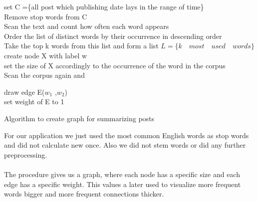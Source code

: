 \begin{algorithm}
	
	set C =\{all post which publishing date lays in the range of time\} \\
	Remove stop words from C \\
	Scan the text and count how often each word appears \\
	Order the list of distinct words by their occurrence in descending order \\
	Take the top k words from this list and form a list $  L = \{ k  \quad most \quad used  \quad words\}$ \\
	{
		create node X with label w \\
		set the size of X accordingly to the occurrence of the word in the corpus  \\
	}
	Scan the corpus again and \\
	{
		{	
			draw edge E($w_1$ ,$w_2$)\\
			set weight of E to 1 \\
			
		}
		
	}
	
	\caption{Algorithm to create graph for summarizing  posts}
\end{algorithm}

For our application we  just used the most common English words as stop words and did not calculate new once. Also we did not stem words or did any further preprocessing. \\
~\\

The procedure gives us a graph, where each node has a specific size and each edge has a specific weight. This values a later used to visualize more frequent words bigger and more frequent connections thicker. 






